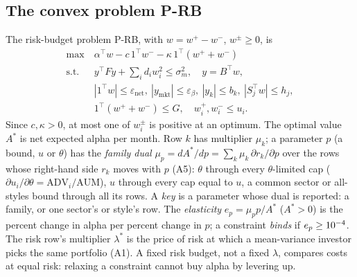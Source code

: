 \documentclass[conference]{IEEEtran}
\newcommand{\T}{^{\top}}
\newcommand{\prb}{\mbox{P-RB}}
\begin{document}
\subsection{The convex problem \prb}
The risk-budget problem \prb, with $w=w^+-w^-$, $w^\pm\ge0$, is
\begin{equation}
\begin{aligned}
\max\ & \alpha\T w-c\,1\T w^- -\kappa\,1\T(w^++w^-)\\
\text{s.t.}\ & y\T Fy+\textstyle\sum_i d_iw_i^2\le\sigma_m^2,\quad y=B\T w,\\
& |1\T w|\le\varepsilon_{\mathrm{net}},\ |y_{\mathrm{mkt}}|\le\varepsilon_\beta,\ |y_k|\le b_k,\ |S_j\T w|\le h_j,\\
& 1\T(w^++w^-)\le G,\quad w_i^+,w_i^-\le u_i .
\end{aligned}
\label{eq:prb}
\end{equation}
Since $c,\kappa>0$, at most one of $w_i^\pm$ is positive at an optimum. The optimal value $A^*$ is net expected alpha per month. Row $k$ has multiplier $\mu_k$; a parameter $p$ (a bound, $u$ or $\theta$) has the \emph{family dual} $\mu_p=dA^*/dp=\sum_k\mu_k\,\partial r_k/\partial p$ over the rows whose right-hand side $r_k$ moves with $p$ (A5): $\theta$ through every $\theta$-limited cap ($\partial u_i/\partial\theta=\mathrm{ADV}_i/\mathrm{AUM}$), $u$ through every cap equal to $u$, a common sector or all-styles bound through all its rows. A \emph{key} is a parameter whose dual is reported: a family, or one sector's or style's row. The \emph{elasticity} $e_p=\mu_pp/A^*$ ($A^*>0$) is the percent change in alpha per percent change in $p$; a constraint \emph{binds} if $e_p\ge10^{-4}$. The risk row's multiplier $\lambda^*$ is the price of risk at which a mean-variance investor picks the same portfolio (A1). A fixed risk budget, not a fixed $\lambda$, compares costs at equal risk: relaxing a constraint cannot buy alpha by levering up.

\end{document}
